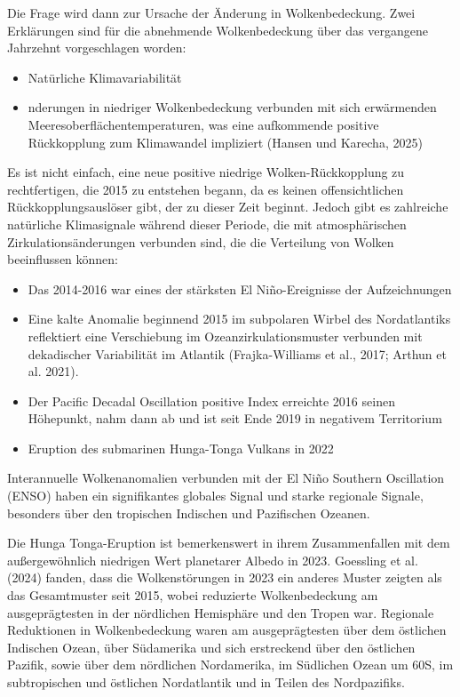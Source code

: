 \documentclass[12pt,paper=a4,DIV=12,parskip=never,chapterprefix=false,headings=standardclasses]{scrreprt}
\begin{document}
Die Frage wird dann zur Ursache der Änderung in Wolkenbedeckung. Zwei Erklärungen sind für die abnehmende Wolkenbedeckung über das vergangene Jahrzehnt vorgeschlagen worden:

\begin{itemize}
\item Natürliche Klimavariabilität 
\item nderungen in niedriger Wolkenbedeckung verbunden mit sich erwärmenden Meeresoberflächentemperaturen, was eine aufkommende positive Rückkopplung zum Klimawandel impliziert (Hansen und Karecha, 2025)
 
\end{itemize}

Es ist nicht einfach, eine neue positive niedrige Wolken-Rückkopplung zu rechtfertigen, die 2015 zu entstehen begann, da es keinen offensichtlichen Rückkopplungsauslöser gibt, der zu dieser Zeit beginnt. Jedoch gibt es zahlreiche natürliche Klimasignale während dieser Periode, die mit atmosphärischen Zirkulationsänderungen verbunden sind, die die Verteilung von Wolken beeinflussen können:

\begin{itemize}
\item Das 2014-2016 war eines der stärksten El Niño-Ereignisse der Aufzeichnungen 
\item Eine kalte Anomalie beginnend 2015 im subpolaren Wirbel des Nordatlantiks reflektiert eine Verschiebung im Ozeanzirkulationsmuster verbunden mit dekadischer Variabilität im Atlantik (Frajka-Williams et al., 2017; Arthun et al. 2021). 
\item Der Pacific Decadal Oscillation positive Index erreichte 2016 seinen Höhepunkt, nahm dann ab und ist seit Ende 2019 in negativem Territorium 
\item Eruption des submarinen Hunga-Tonga Vulkans in 2022 
\end{itemize}


Interannuelle Wolkenanomalien verbunden mit der El Niño Southern Oscillation (ENSO) haben ein signifikantes globales Signal und starke regionale Signale, besonders über den tropischen Indischen und Pazifischen Ozeanen.

Die Hunga Tonga-Eruption ist bemerkenswert in ihrem Zusammenfallen mit dem außergewöhnlich niedrigen Wert planetarer Albedo in 2023. Goessling et al. (2024) fanden, dass die Wolkenstörungen in 2023 ein anderes Muster zeigten als das Gesamtmuster seit 2015, wobei reduzierte Wolkenbedeckung am ausgeprägtesten in der nördlichen Hemisphäre und den Tropen war. Regionale Reduktionen in Wolkenbedeckung waren am ausgeprägtesten über dem östlichen Indischen Ozean, über Südamerika und sich erstreckend über den östlichen Pazifik, sowie über dem nördlichen Nordamerika, im Südlichen Ozean um 60S, im subtropischen und östlichen Nordatlantik und in Teilen des Nordpazifiks.
\end{document}
